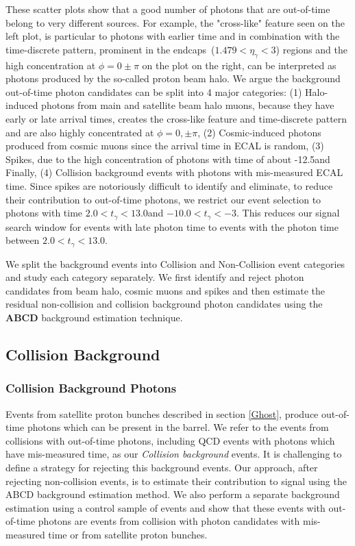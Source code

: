 \vspace{5mm}
These scatter plots show that a good number of photons that are out-of-time belong to very different sources. For example, the "cross-like" feature seen on the left plot, is particular to photons with earlier time and in combination with the time-discrete pattern, prominent in the endcaps~($1.479 < \eta_{\gamma} < 3$) regions and the high concentration at $\phi=0\pm\pi$ on the plot on the right, can be interpreted as photons produced by the so-called proton beam halo. We argue the background out-of-time photon candidates can be split into 4 major categories: (1) Halo-induced photons from main and satellite beam halo muons, because they have early or late arrival times, creates the cross-like feature and time-discrete pattern and are also highly concentrated at $\phi=0,\pm\pi$, (2) Cosmic-induced photons produced from cosmic muons since the arrival time in ECAL is random, (3) Spikes, due to the high concentration of photons with time of about -12.5\ns and Finally, (4) Collision background events with photons with mis-measured ECAL time.
\newline
Since spikes are notoriously difficult to identify and eliminate, to reduce their contribution to out-of-time photons, we restrict our event selection to photons with time $ 2.0 < t_{\gamma} < 13.0$\ns and $-10.0 < t_{\gamma} < -3$\ns. This reduces our signal search window for events with late photon time to events with the photon time between $2.0 < t_{\gamma} < 13.0$\ns.
\par 
We split the background events into Collision and Non-Collision event categories and study each category separately. We first identify and reject photon candidates from beam halo, cosmic muons and spikes and then estimate the residual non-collision and collision background photon candidates  using the \textbf{\textsf{ABCD}} background estimation technique. 

\subsection{Collision Background}
\subsubsection{Collision Background Photons}
Events from satellite proton bunches described in section \ref{Ghost}, produce out-of-time photons which can be present in the barrel. We refer to the events from collisions with out-of-time photons, including QCD events with photons which have mis-measured time, as our \textit{Collision background} events. It is challenging to define a strategy for rejecting this background events. Our approach, after rejecting non-collision events, is to estimate their contribution to signal using the \textsf{ABCD} background estimation method. We also perform a separate background estimation using a control sample of \PZ events and show that these events with out-of-time photons are events from collision with photon candidates with mis-measured time or from satellite proton bunches.

